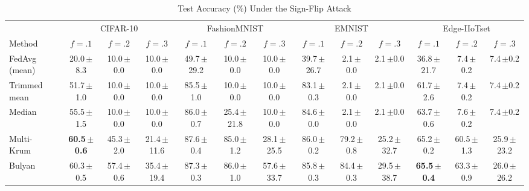 \begin{table}[!t]\centering\footnotesize
\caption{Test Accuracy (\%) Under the Sign-Flip Attack}
\label{tab:signflip}
\setlength{\tabcolsep}{1pt}
\begin{tabular}{@{}lcccccccccccc@{}}\toprule
& \multicolumn{3}{c}{CIFAR-10} & \multicolumn{3}{c}{FashionMNIST} & \multicolumn{3}{c}{EMNIST} & \multicolumn{3}{c}{Edge-IIoTset}\\
\cmidrule(lr){2-4}\cmidrule(lr){5-7}\cmidrule(lr){8-10}\cmidrule(l){11-13}
Method & $f{=}.1$ & $f{=}.2$ & $f{=}.3$ & $f{=}.1$ & $f{=}.2$ & $f{=}.3$ & $f{=}.1$ & $f{=}.2$ & $f{=}.3$ & $f{=}.1$ & $f{=}.2$ & $f{=}.3$\\\midrule
FedAvg (mean)~\cite{mcmahan2017} & 20.0\,{\scriptsize$\pm$8.3} & 10.0\,{\scriptsize$\pm$0.0} & 10.0\,{\scriptsize$\pm$0.0} & 49.7\,{\scriptsize$\pm$29.2} & 10.0\,{\scriptsize$\pm$0.0} & 10.0\,{\scriptsize$\pm$0.0} & 39.7\,{\scriptsize$\pm$26.7} & 2.1\,{\scriptsize$\pm$0.0} & 2.1\,{\scriptsize$\pm$0.0} & 36.8\,{\scriptsize$\pm$21.7} & 7.4\,{\scriptsize$\pm$0.2} & 7.4\,{\scriptsize$\pm$0.2}\\
Trimmed mean~\cite{yin2018} & 51.7\,{\scriptsize$\pm$1.0} & 10.0\,{\scriptsize$\pm$0.0} & 10.0\,{\scriptsize$\pm$0.0} & 85.5\,{\scriptsize$\pm$1.0} & 10.0\,{\scriptsize$\pm$0.0} & 10.0\,{\scriptsize$\pm$0.0} & 83.1\,{\scriptsize$\pm$0.3} & 2.1\,{\scriptsize$\pm$0.0} & 2.1\,{\scriptsize$\pm$0.0} & 61.7\,{\scriptsize$\pm$2.6} & 7.4\,{\scriptsize$\pm$0.2} & 7.4\,{\scriptsize$\pm$0.2}\\
Median~\cite{yin2018} & 55.5\,{\scriptsize$\pm$1.5} & 10.0\,{\scriptsize$\pm$0.0} & 10.0\,{\scriptsize$\pm$0.0} & 86.0\,{\scriptsize$\pm$0.7} & 25.4\,{\scriptsize$\pm$21.8} & 10.0\,{\scriptsize$\pm$0.0} & 84.6\,{\scriptsize$\pm$0.0} & 2.1\,{\scriptsize$\pm$0.0} & 2.1\,{\scriptsize$\pm$0.0} & 63.7\,{\scriptsize$\pm$0.6} & 7.6\,{\scriptsize$\pm$0.2} & 7.4\,{\scriptsize$\pm$0.2}\\
Multi-Krum~\cite{blanchard2017} & \textbf{60.5\,{\scriptsize$\pm$0.6}} & 45.3\,{\scriptsize$\pm$2.0} & 21.4\,{\scriptsize$\pm$11.6} & 87.6\,{\scriptsize$\pm$0.4} & 85.0\,{\scriptsize$\pm$1.2} & 28.1\,{\scriptsize$\pm$25.5} & 86.0\,{\scriptsize$\pm$0.2} & 79.2\,{\scriptsize$\pm$0.8} & 25.2\,{\scriptsize$\pm$32.7} & 65.2\,{\scriptsize$\pm$0.2} & 60.5\,{\scriptsize$\pm$1.3} & 25.9\,{\scriptsize$\pm$23.2}\\
Bulyan~\cite{bulyan} & 60.3\,{\scriptsize$\pm$0.5} & 57.4\,{\scriptsize$\pm$0.6} & 35.4\,{\scriptsize$\pm$19.4} & 87.3\,{\scriptsize$\pm$0.3} & 86.0\,{\scriptsize$\pm$1.0} & 57.6\,{\scriptsize$\pm$33.7} & 85.8\,{\scriptsize$\pm$0.3} & 84.4\,{\scriptsize$\pm$0.3} & 29.5\,{\scriptsize$\pm$38.7} & \textbf{65.5\,{\scriptsize$\pm$0.4}} & 63.3\,{\scriptsize$\pm$0.9} & 26.0\,{\scriptsize$\pm$26.2}\\

\end{tabular}
\end{table}
